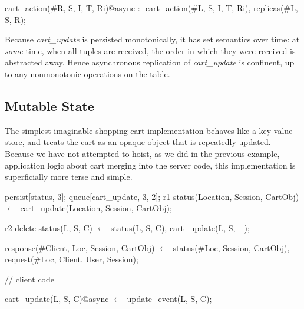 \begin{Dedalus}
cart_action(#R, S, I, T, Ri)@async :-
    cart_action(#L, S, I, T, Ri),
    replicas(#L, S, R);
\end{Dedalus}

Because {\em cart\_update} is persisted monotonically, it has set semantics over time: at
{\em some} time, when all tuples are received, the order in which they were received is
abstracted away.  Hence asynchronous replication of {\em cart\_update} is confluent,
up to any nonmonotonic operations on the table.


\subsection{Mutable State}

The simplest imaginable shopping cart implementation behaves like a key-value store,
and treats the cart as an opaque object that is repeatedly updated.    Because we have not
attempted to hoist, as we did in the previous example, application logic about cart merging
into the server code, this implementation is superficially more terse and simple.

\begin{Dedalus}
persist[status, 3];
queue[cart_update, 3, 2];
r1
status(Location, Session, CartObj) \(\leftarrow\)
    cart_update(Location,  Session, CartObj);
    
r2
delete status(L, S, C) \(\leftarrow\)
    status(L, S, C), cart_update(L, S, _);
  
response(#Client, Loc, Session, CartObj) \(\leftarrow\)
    status(#Loc, Session, CartObj),
    request(#Loc, Client, User, Session);

// client code

cart_update(L, S, C)@async \(\leftarrow\) 
    update_event(L, S, C);

\end{Dedalus}

